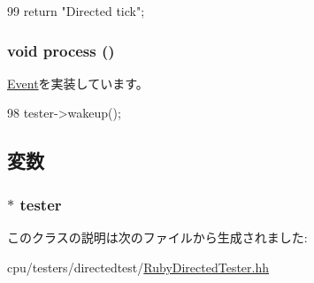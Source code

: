 \begin{DoxyCode}
99 { return "Directed tick"; }
\end{DoxyCode}
\hypertarget{classRubyDirectedTester_1_1DirectedStartEvent_a2e9c5136d19b1a95fc427e0852deab5c}{
\subsubsection[{process}]{\setlength{\rightskip}{0pt plus 5cm}void process ()}}
\label{classRubyDirectedTester_1_1DirectedStartEvent_a2e9c5136d19b1a95fc427e0852deab5c}


\hyperlink{classEvent_a142b75b68a6291400e20fb0dd905b1c8}{Event}を実装しています。


\begin{DoxyCode}
98 { tester->wakeup(); }
\end{DoxyCode}


\subsection{変数}
\hypertarget{classRubyDirectedTester_1_1DirectedStartEvent_acb5296901e83f3dd66a2fdaab4fbc259}{
\subsubsection[{tester}]{$\ast$ {\bf tester}}}
\label{classRubyDirectedTester_1_1DirectedStartEvent_acb5296901e83f3dd66a2fdaab4fbc259}


このクラスの説明は次のファイルから生成されました:\begin{DoxyCompactItemize}
\item 
cpu/testers/directedtest/\hyperlink{RubyDirectedTester_8hh}{RubyDirectedTester.hh}\end{DoxyCompactItemize}
